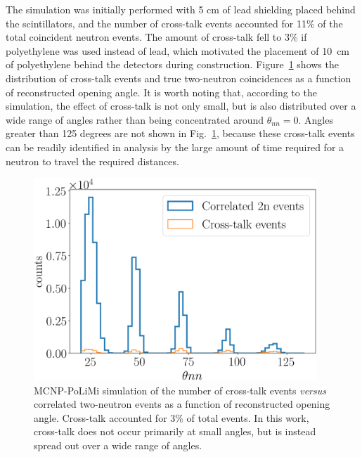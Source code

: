 The simulation was initially performed with 5 cm of lead shielding placed behind the scintillators, and the number of cross-talk events accounted for 11\% of the total coincident neutron events.
The amount of cross-talk fell to 3\% if polyethylene was used instead of lead, which motivated the placement of 10~cm of polyethylene behind the detectors during construction.
Figure~\ref{fig:CrosstalkVScoincidence} shows the distribution of cross-talk events and true two-neutron coincidences as a function of reconstructed opening angle.
It is worth noting that, according to the simulation, the effect of cross-talk is not only small, but is also distributed over a wide range of angles rather than being concentrated around $\theta_{nn}=0$.
Angles greater than 125 degrees are not shown in Fig.~\ref{fig:CrosstalkVScoincidence}, because these cross-talk events can be readily identified in analysis by the large amount of time required for a neutron to travel the required distances.
\begin{figure}
    \centering
    \includegraphics[width = 0.95\textwidth]{Content/Errors/CrosstalkVScoincidence.png}
    \caption{
    MCNP-PoLiMi simulation of the number of cross-talk events \emph{versus} correlated two-neutron events as a function of reconstructed opening angle.
    Cross-talk accounted for 3\% of total events.
    In this work, cross-talk does not occur primarily at small angles, but is instead spread out over a wide range of angles.
    }
    \label{fig:CrosstalkVScoincidence}
\end{figure}


